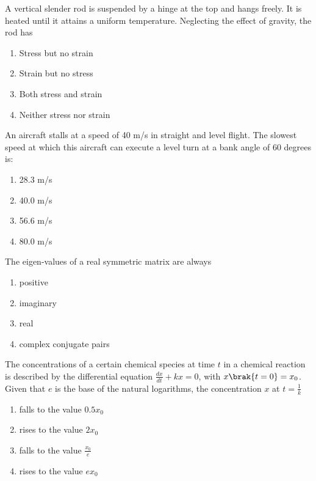 \item A vertical slender rod is suspended by a hinge at the top and hangs freely. It is heated until it attains a uniform temperature. Neglecting the effect of gravity, the rod has
\begin{multicols}{2}
\begin{enumerate}
    \item Stress but no strain
    \item Strain but no stress
    \item Both stress and strain
    \item Neither stress nor strain
\end{enumerate}
\end{multicols}

 \item An aircraft stalls at a speed of 40 m/s in straight and level flight. The slowest speed at which this aircraft can execute a level turn at a bank angle of 60 degrees is:
    \begin{multicols}{4}
    \begin{enumerate}
    \item  28.3 m/s
    \item  40.0 m/s
    \item  56.6 m/s
    \item  80.0 m/s
\end{enumerate}
 \end{multicols}

\item The eigen-values of a real symmetric matrix are always
    \begin{multicols}{2}
        \begin{enumerate}
        \item positive
        \item imaginary
        \item real
        \item complex conjugate pairs
        \end{enumerate}
        \end{multicols}
        
         
\item The concentrations of a certain chemical species at time $t$ in a chemical reaction is described by the differential equation $\frac{dx}{dt}+kx=0$, with $x\brak{t=0}=x_{0}$. Given that $e$ is the base of the natural logarithms, the concentration $x$ at $t=\frac{1}{k}$
       \begin{multicols}{2}
        \begin{enumerate}
        \item falls to the value $0.5x_{0}$
        \item rises to the value $2x_{0}$
        \item falls to the value $\frac{x_{0}}{e}$
        \item rises to the value $ex_{0}$
        \end{enumerate}
        \end{multicols}

